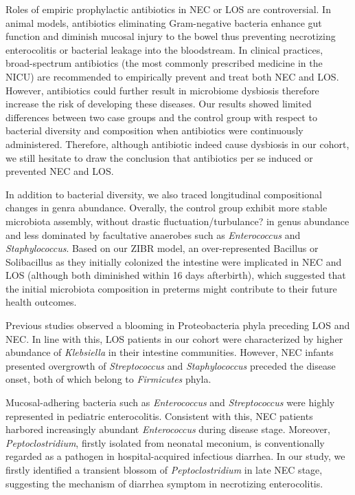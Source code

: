 \documentclass[fleqn,10pt]{wlpeerj} %
\begin{document}
Roles of empiric prophylactic antibiotics in NEC or LOS are controversial. In animal models, antibiotics eliminating Gram-negative bacteria enhance gut function and diminish mucosal injury to the bowel thus preventing necrotizing enterocolitis or bacterial leakage into the bloodstream\citep{carlisle2011gram, jensen2013antibiotics, birck2015enteral}. In clinical practices, broad-spectrum antibiotics (the most commonly prescribed medicine in the NICU) are recommended to empirically prevent and treat both NEC and LOS\citep{bury2001enteral, brook2008microbiology, kimberlin2018red}. However, antibiotics could further result in microbiome dysbiosis therefore increase the risk of developing these diseases\citep{gibson2015antibiotics, kuppala2011prolonged, martinez2017early, cantey2018early}. Our results showed limited differences between two case groups and the control group with respect to bacterial diversity and composition when antibiotics were continuously administered. Therefore, although antibiotic indeed cause dysbiosis in our cohort, we still hesitate to draw the conclusion that antibiotics per se induced or prevented NEC and LOS.

In addition to bacterial diversity, we also traced longitudinal compositional changes in genra abundance. Overally, the control group exhibit more stable microbiota assembly, without drastic fluctuation/turbulance? in genus abundance and less dominated by facultative anaerobes such as \textit{Enterococcus} and \textit{Staphylococcus}\citep{gibson2015antibiotics, la2014patterned, grier2017impact}. Based on our ZIBR model, an over-represented Bacillus or Solibacillus as they initially colonized the intestine were implicated in NEC and LOS (although both diminished within 16 days afterbirth), which suggested that the initial microbiota composition in preterms might contribute to their future health outcomes.

Previous studies observed a blooming in Proteobacteria phyla\citep{mai2013distortions,mai2011fecal} preceding LOS and NEC. In line with this, LOS patients in our cohort were characterized by higher abundance of \textit{Klebsiella} in their intestine communities. However, NEC infants presented overgrowth of \textit{Streptococcus} and \textit{Staphylococcus} preceded the disease onset, both of which belong to \textit{Firmicutes} phyla.

Mucosal-adhering bacteria such as \textit{Enterococcus} and \textit{Streptococcus} were highly represented in pediatric enterocolitis\citep{normann2013intestinal, zhou2016increased}. Consistent with this, NEC patients harbored increasingly abundant \textit{Enterococcus} during disease stage. Moreover, \textit{Peptoclostridium}, firstly isolated from neonatal meconium\citep{hall1935intestinal}, is conventionally regarded as a pathogen in hospital-acquired infectious diarrhea\citep{rodriguez2016clostridium, pereira2016complete}. In our study, we firstly identified a transient blossom of \textit{Peptoclostridium} in late NEC stage, suggesting the mechanism of diarrhea symptom in necrotizing enterocolitis.
\end{document}
